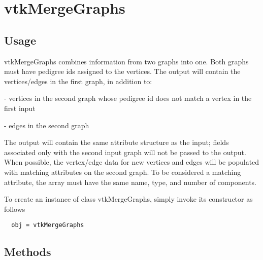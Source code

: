\section{vtkMergeGraphs}

\subsection{Usage}

 vtkMergeGraphs combines information from two graphs into one.
 Both graphs must have pedigree ids assigned to the vertices.
 The output will contain the vertices/edges in the first graph, in
 addition to:

  - vertices in the second graph whose pedigree id does not
    match a vertex in the first input

  - edges in the second graph

 The output will contain the same attribute structure as the input;
 fields associated only with the second input graph will not be passed
 to the output. When possible, the vertex/edge data for new vertices and
 edges will be populated with matching attributes on the second graph.
 To be considered a matching attribute, the array must have the same name,
 type, and number of components.


To create an instance of class vtkMergeGraphs, simply
invoke its constructor as follows
\begin{verbatim}
  obj = vtkMergeGraphs
\end{verbatim}
\subsection{Methods}

